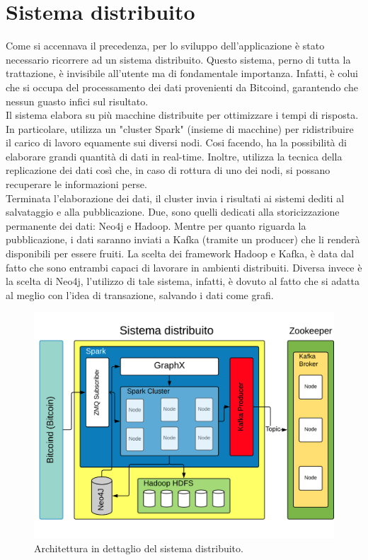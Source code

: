 \section{Sistema distribuito}
\label{sec:sistema distribuito}
Come si accennava il precedenza, per lo sviluppo dell'applicazione è stato necessario ricorrere ad un sistema distribuito. Questo sistema, perno di tutta la trattazione, è invisibile all'utente ma di fondamentale importanza. Infatti, è colui che si occupa del processamento dei dati provenienti da Bitcoind, garantendo che nessun guasto infici sul risultato.
\\Il sistema elabora su più macchine distribuite per ottimizzare i tempi di risposta. In particolare, utilizza un "cluster Spark" (insieme di macchine) per ridistribuire il carico di lavoro equamente sui diversi nodi. Cosi facendo, ha la possibilità di elaborare grandi quantità di dati in real-time. Inoltre, utilizza la tecnica della replicazione dei dati così che, in caso di rottura di uno dei nodi, si possano recuperare le informazioni perse.
\\Terminata l'elaborazione dei dati, il cluster invia i risultati ai sistemi dediti al salvataggio e alla pubblicazione. Due, sono quelli dedicati alla storicizzazione permanente dei dati: Neo4j e Hadoop. Mentre per quanto riguarda la pubblicazione, i dati saranno inviati a Kafka (tramite un producer) che li renderà disponibili per essere fruiti. La scelta dei framework Hadoop e Kafka, è data dal fatto che sono entrambi capaci di lavorare in ambienti distribuiti. Diversa invece è la scelta di Neo4j, l'utilizzo di tale sistema, infatti, è dovuto al fatto che si adatta al meglio con l'idea di transazione, salvando i dati come grafi.

\begin{figure}[H]
	\centering
	\includegraphics[width=\textwidth]{images/sistemaDistribuito.png}
	\caption{Architettura in dettaglio del sistema distribuito.}
	\label{fig:distribuitedSystemArchitetture}
\end{figure}